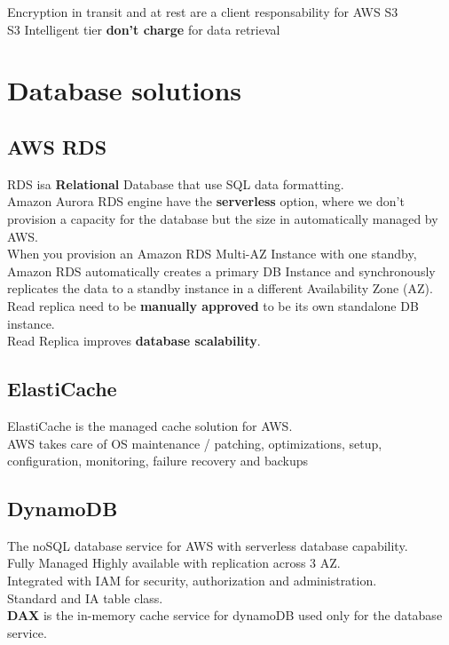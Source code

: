 \documentclass[12pt, letterpaper, twoside]{article}
\begin{document}
Encryption in transit and at rest are a client responsability for AWS S3\\

S3 Intelligent tier \textbf{don't charge} for data retrieval\\
\section{Database solutions}
\subsection{AWS RDS}
RDS isa \textbf{Relational} Database that use SQL data formatting.\\
Amazon Aurora RDS engine have the \textbf{serverless} option, where we don't provision a capacity for the database
but the size in automatically managed by AWS.\\

When you provision an Amazon RDS Multi-AZ Instance with one standby, Amazon RDS automatically creates a primary DB 
Instance and synchronously replicates the data to a standby instance in a different Availability Zone (AZ).\\

Read replica need to be \textbf{manually approved} to be its own standalone DB instance.\\
Read Replica improves \textbf{database scalability}.\\

\subsection{ElastiCache}
ElastiCache is the managed cache solution for AWS.\\
AWS takes care of OS maintenance / patching, optimizations, setup, configuration, monitoring, 
failure recovery and backups

\subsection{DynamoDB}
The noSQL database service for AWS with serverless database capability.\\
Fully Managed Highly available with replication across 3 AZ.\\
Integrated with IAM for security, authorization and administration.\\
Standard and IA table class.\\
\textbf{DAX} is the in-memory cache service for dynamoDB used only for the database service.
\end{document}
